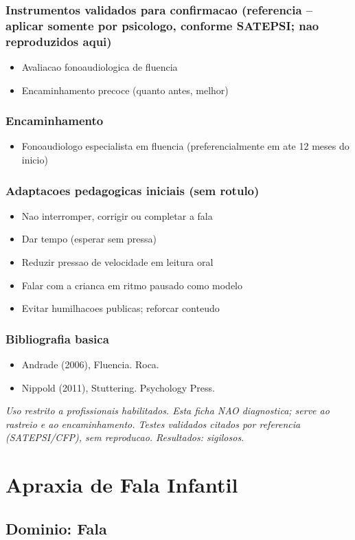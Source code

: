 \documentclass[a4paper,11pt]{book}
\newcommand{\avisolegal}{\par\medskip\noindent\footnotesize\itshape
\color{cinza}Uso restrito a profissionais habilitados. Esta ficha NAO diagnostica;
serve ao rastreio e ao encaminhamento. Testes validados citados por referencia
(SATEPSI/CFP), sem reproducao. Resultados: sigilosos.\color{black}\par}
\begin{document}
\subsection*{Instrumentos validados para confirmacao (referencia -- aplicar somente por psicologo, conforme SATEPSI; nao reproduzidos aqui)}
\begin{itemize}
\item Avaliacao fonoaudiologica de fluencia
\item Encaminhamento precoce (quanto antes, melhor)
\end{itemize}
\subsection*{Encaminhamento}
\begin{itemize}
\item Fonoaudiologo especialista em fluencia (preferencialmente em ate 12 meses do inicio)
\end{itemize}
\subsection*{Adaptacoes pedagogicas iniciais (sem rotulo)}
\begin{itemize}
\item Nao interromper, corrigir ou completar a fala
\item Dar tempo (esperar sem pressa)
\item Reduzir pressao de velocidade em leitura oral
\item Falar com a crianca em ritmo pausado como modelo
\item Evitar humilhacoes publicas; reforcar conteudo
\end{itemize}
\subsection*{Bibliografia basica}
\begin{itemize}
\item Andrade (2006), Fluencia. Roca.
\item Nippold (2011), Stuttering. Psychology Press.
\end{itemize}
\avisolegal


\chapter{Apraxia de Fala Infantil}
\section*{Dominio: Fala}
\end{document}
